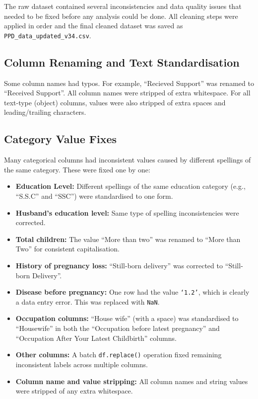 The raw dataset contained several inconsistencies and data quality issues that needed to be fixed before any analysis could be done. All cleaning steps were applied in order and the final cleaned dataset was saved as \texttt{PPD\_data\_updated\_v34.csv}.

\subsection{Column Renaming and Text Standardisation}

Some column names had typos. For example, ``Recieved Support'' was renamed to ``Received Support''. All column names were stripped of extra whitespace. For all text-type (object) columns, values were also stripped of extra spaces and leading/trailing characters.

\subsection{Category Value Fixes}

Many categorical columns had inconsistent values caused by different spellings of the same category. These were fixed one by one:

\begin{itemize}
    \item \textbf{Education Level:} Different spellings of the same education category (e.g., ``S.S.C'' and ``SSC'') were standardised to one form.
    \item \textbf{Husband's education level:} Same type of spelling inconsistencies were corrected.
    \item \textbf{Total children:} The value ``More than two'' was renamed to ``More than Two'' for consistent capitalisation.
    \item \textbf{History of pregnancy loss:} ``Still-born delivery'' was corrected to ``Still-born Delivery''.
    \item \textbf{Disease before pregnancy:} One row had the value \texttt{`1.2'}, which is clearly a data entry error. This was replaced with \texttt{NaN}.
    \item \textbf{Occupation columns:} ``House wife'' (with a space) was standardised to ``Housewife'' in both the ``Occupation before latest pregnancy'' and ``Occupation After Your Latest Childbirth'' columns.
    \item \textbf{Other columns:} A batch \texttt{df.replace()} operation fixed remaining inconsistent labels across multiple columns.
    \item \textbf{Column name and value stripping:} All column names and string values were stripped of any extra whitespace.
\end{itemize}

